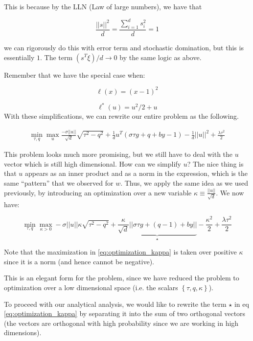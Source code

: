  This is because by the LLN (Law of large numbers), we have that
 
 $$\frac{||s||^2}{d} = \frac{\sum_{i=1}^d s_i^2}{d } = 1$$
 
 we can rigorously do this with error term and stochastic domination, but this is essentially $1$. The term $(s^T\xi)/d \longrightarrow 0$ by the same logic as above.
 
 
 Remember that we have the special case when: 
 
 
 $$\ell(x) = (x-1)^2$$ 
 
 $$\ell^*(u) = u^2/2 + u$$
  With these simplifications, we can rewrite our entire problem as the following.

 
 \begin{align*}
	 \min_{\tau, q} \max_{u} \frac{-\sigma||u||}{\sqrt{d}}\sqrt{\tau^2 - q^2} + \frac{1}{d}u^T(\sigma \tau g + q + by - 1) - \frac{1}{d}||u||^2 + \frac{\lambda\tau^2}{2}
 \end{align*}
 
 This problem looks much more promising, but we still have to deal with the $u$ vector which is still high dimensional. 
How can we simplify $u$? 
The nice thing is that $u$ appears as an inner product and as a norm in the expression, which is the same ``pattern'' that we observed for $w$. 
Thus, we apply the same idea as we used previously, by introducing an optimization over a new variable $\kappa \equiv\frac{||u||}{\sqrt{d}}$.
We now have:

\begin{equation}\label{eq:optimization_kappa}
	\min_{\tau, q} \max_{\kappa>0} -\sigma||u||\kappa\sqrt{\tau^2 - q^2} + 
	\underbrace{\frac{\kappa}{\sqrt{d}}\left|\left|\sigma \tau g + \left(q-1\right) + by \right|\right|}_{\star} -
	\frac{\kappa^2}{2} +
	\frac{\lambda\tau^2}{2}
\end{equation}

Note that the maximization in \ref{eq:optimization_kappa} is taken over positive $\kappa$ since it is a norm (and hence cannot be negative).

This is an elegant form for the problem, since we have reduced the problem to optimization over a low dimensional space (i.e. the scalars $\left\{ \tau, q, \kappa \right\}$).

To proceed with our analytical analysis, we would like to rewrite the term $\star$ in eq \ref{eq:optimization_kappa} by separating it into the sum of two orthogonal vectors (the vectors are orthogonal with high probability since we are working in high dimensions). 

